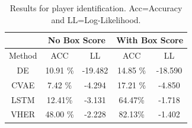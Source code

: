\documentclass[letterpaper]{article} %
\begin{document}

\begin{table}[t]
\centering
    \begin{tabular}{c|cc|cc}
    \hline
     & \multicolumn{2}{c|}{No Box Score} & \multicolumn{2}{c}{With Box Score} \\ \hline
    Method & ACC & LL & ACC & LL \\ \hline
    DE & 10.91 \% & -19.482 & 14.85 \% & -18.590 \\
    CVAE & 7.42 \% & -4.294 & 17.21 \% & -4.850 \\
    LSTM & 12.41\% & -3.131 & 64.47\% & -1.718 \\
    VHER & 48.00 \% & -2.228 & 82.13\% & -1.402 \\ \hline
    \end{tabular}
    \caption{Results for player identification. Acc=Accuracy and LL=Log-Likelihood.}
    \label{table:exp-pid}
\end{table}
\end{document}
